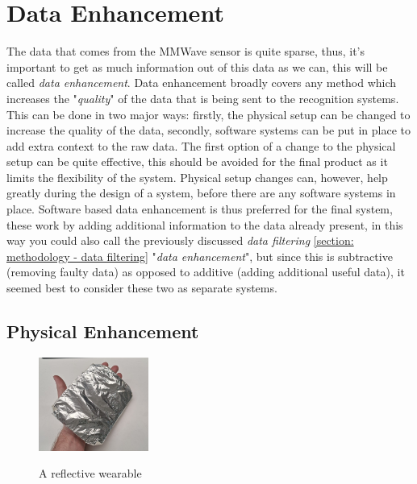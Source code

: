 
\section{Data Enhancement}
\label{section: methodology - data enhancement}


The data that comes from the MMWave sensor is quite sparse, thus, it's important to get as much information out of this data as we can, this will be called \textit{data enhancement}.
Data enhancement broadly covers any method which increases the "\textit{quality}" of the data that is being sent to the recognition systems.
This can be done in two major ways: firstly, the physical setup can be changed to increase the quality of the data, secondly, software systems can be put in place to add extra context to the raw data.
The first option of a change to the physical setup can be quite effective, this should be avoided for the final product as it limits the flexibility of the system.
Physical setup changes can, however, help greatly during the design of a system, before there are any software systems in place.
Software based data enhancement is thus preferred for the final system, these work by adding additional information to the data already present, in this way you could also call the previously discussed \textit{data filtering} \ref{section: methodology - data filtering} "\textit{data enhancement}", but since this is subtractive (removing faulty data) as opposed to additive (adding additional useful data), it seemed best to consider these two as separate systems.

\subsection{Physical Enhancement}
\label{sub-section: methodology - data enhancement - physical enhancement}

\begin{figure}
    \caption{A reflective wearable}
    \centering
    \includegraphics[width=0.32\textwidth]{figures/reflective wearable.png}
    \label{fig: reflective glove wearable}
\end{figure}

